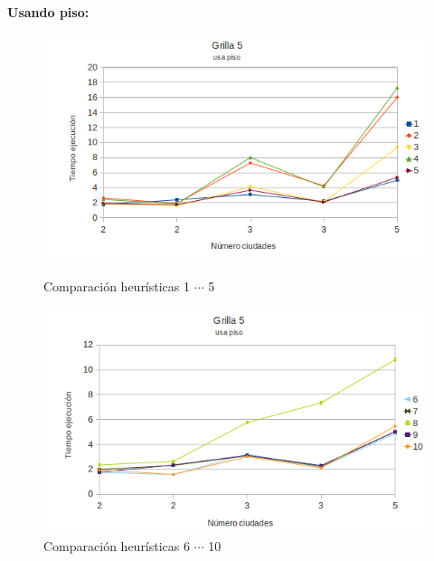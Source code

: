 \documentclass[10pt]{article}
\begin{document}
\newpage
\textbf{Usando piso:}

\begin{figure}[ht]

\begin{minipage}[b]{0.45\linewidth}
 \centering
 \includegraphics[width=\textwidth]{grilla5floor0.png}
 \caption{Comparación heurísticas  1 $\cdots$ 5}
 \label{fig:grid5floor0}
\end{minipage}
\hspace{0.5cm}
\begin{minipage}[b]{0.45\linewidth}
 \centering
 \includegraphics[width=\textwidth]{grilla5floor1.png}
 \caption{Comparación heurísticas  6 $\cdots$ 10}
 \label{fig:grid5floor1}
\end{minipage}


\end{figure}
\end{document}

